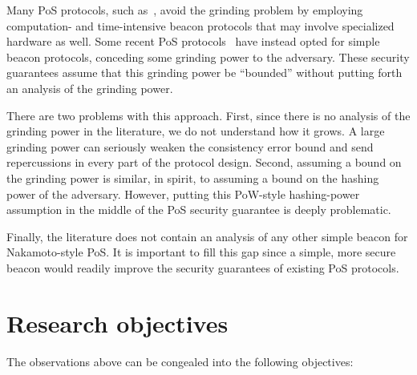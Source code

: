 Many PoS protocols, such as~\cite{Ouroboros,Etherium}, 
avoid the grinding problem 
by employing computation- and time-intensive 
beacon protocols that may involve specialized hardware as well. 
Some recent PoS protocols~\cite{Praos,SnowWhite}  
have instead opted for simple beacon protocols, 
conceding some grinding power to the adversary.
These security guarantees assume that this grinding power be ``bounded'' 
without putting forth an analysis of the grinding power.

There are two problems with this approach.
First, since there is no analysis of the grinding power in the literature, 
we do not understand how it grows. 
A large grinding power can seriously weaken the consistency error bound and 
send repercussions in every part of the protocol design. 
Second, 
assuming a bound on the grinding power is similar, in spirit, to 
assuming a bound on the hashing power of the adversary. 
However, putting this PoW-style hashing-power assumption 
in the middle of the PoS security guarantee 
is deeply problematic.

Finally, the literature does not contain an analysis of 
any other simple beacon for Nakamoto-style PoS. 
It is important to fill this gap 
since a simple, more secure beacon 
would readily improve the security guarantees of existing PoS protocols.













\section{Research objectives}\label{sec:intro-objectives}
The observations above can be congealed into the following objectives:

